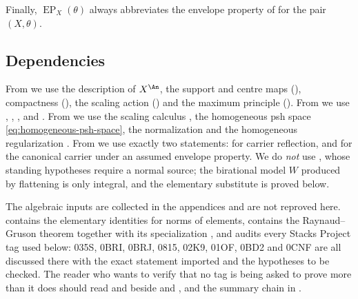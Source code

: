 Finally, $\operatorname{EP}_X(\theta)$ always abbreviates the envelope
property of  for the pair $(X,\theta)$.

\subsection{Dependencies}
\label{sec:ch41-dependencies}

From  we use the description of
$X^{\An}$, the support and centre maps
(), compactness
(), the scaling action
() and the maximum principle
().  From
 we use ,
, ,
 and .  From
 we use the scaling calculus
, the homogeneous psh space
\eqref{eq:homogeneous-psh-space}, the normalization
 and the homogeneous
regularization .  From
 we use exactly two statements:
 for carrier reflection, and
 for the canonical carrier under an assumed
envelope property.  We do \emph{not} use , whose
standing hypotheses require a normal source; the birational model $W$
produced by flattening is only integral, and the elementary substitute
 is proved below.

The algebraic inputs are collected in the appendices and are not reproved
here.   contains the elementary identities
for norms of elements,  contains the
Raynaud--Gruson theorem  together with its
specialization , and
 audits every Stacks Project tag used below: 035S, 0BRI,
0BRJ, 0815, 02K9, 01OF, 0BD2 and 0CNF are all discussed there with the exact
statement imported and the hypotheses to be checked.  The reader who wants
to verify that no tag is being asked to prove more than it does should read
 and  beside
 and , and the
summary chain in .

